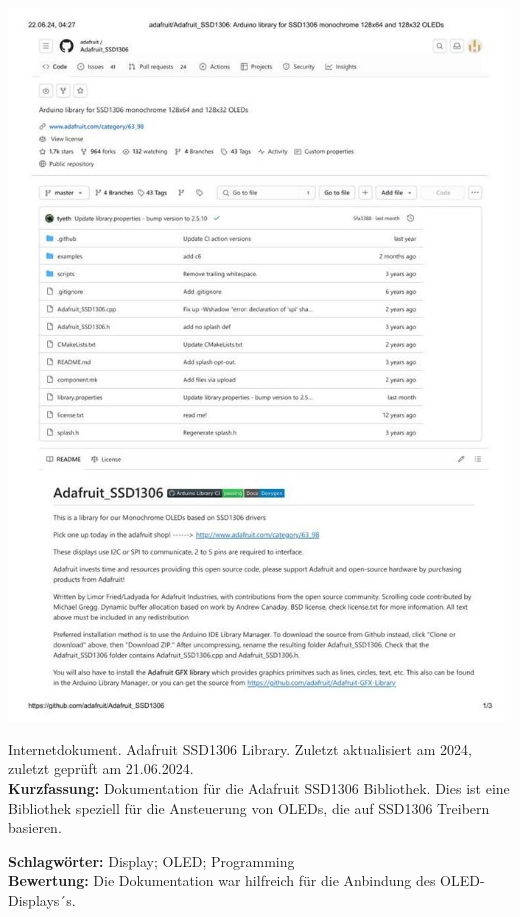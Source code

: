 {
	\begin{minipage}{0.38\textwidth}
		\includegraphics[width=\linewidth]{images/Adafruit2.jpg}
	\end{minipage}
	\hfill
	\begin{minipage}{0.6\textwidth}
		Internetdokument. Adafruit SSD1306 Library. Zuletzt aktualisiert am 2024, zuletzt geprüft am 21.06.2024.
		\\ \textbf{Kurzfassung:}
	Dokumentation für die Adafruit SSD1306 Bibliothek. Dies ist eine Bibliothek speziell für die Ansteuerung von OLEDs, die auf SSD1306 Treibern basieren.
	\end{minipage}
	\textbf{Schlagwörter:}
	Display; OLED; Programming
	\\ \textbf{Bewertung:}
	Die Dokumentation war hilfreich für die Anbindung des OLED-Displays´s.
}


